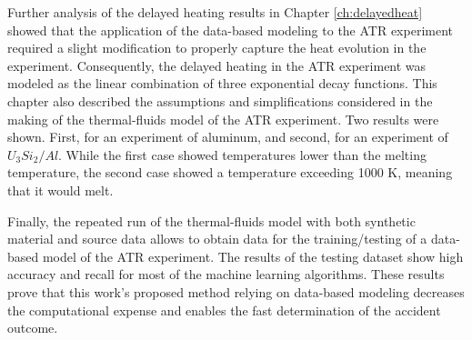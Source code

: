Further analysis of the delayed heating results in Chapter \ref{ch:delayedheat} showed that the application of the data-based modeling to the ATR experiment required a slight modification to properly capture the heat evolution in the experiment.
Consequently, the delayed heating in the ATR experiment was modeled as the linear combination of three exponential decay functions.
This chapter also described the assumptions and simplifications considered in the making of the thermal-fluids model of the ATR experiment.
Two results were shown.
First, for an experiment of aluminum, and second, for an experiment of $U_3Si_2/Al$.
While the first case showed temperatures lower than the melting temperature, the second case showed a temperature exceeding 1000 K, meaning that it would melt.

Finally, the repeated run of the thermal-fluids model with both synthetic material and source data allows to obtain data for the training/testing of a data-based model of the ATR experiment.
The results of the testing dataset show high accuracy and recall for most of the machine learning algorithms.
These results prove that this work's proposed method relying on data-based modeling decreases the computational expense and enables the fast determination of the accident outcome.




